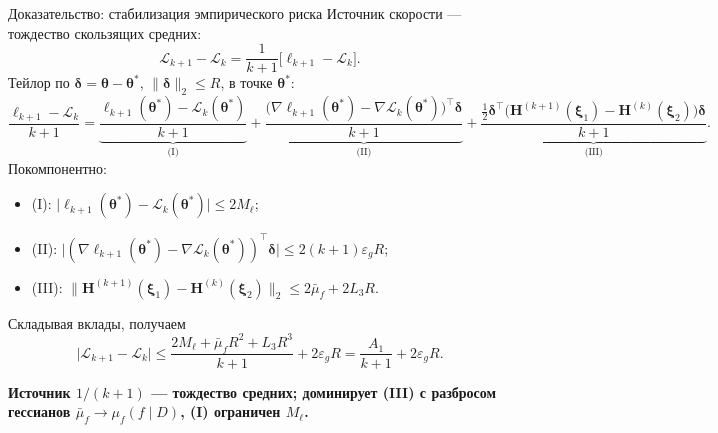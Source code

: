 \documentclass[9pt,pdf,hyperref={unicode}]{beamer}
\newcommand{\key}[1]{\par\vspace{0.5ex}\noindent\textbf{\color{darkgreen}#1}}
\begin{document}
\begin{frame}{Доказательство: стабилизация эмпирического риска}
\justifying
\footnotesize
\vspace{-2pt}
Источник скорости --- тождество скользящих средних:
\[
    \mathcal{L}_{k+1}-\mathcal{L}_k=\frac{1}{k+1}\bigl[\ell_{k+1}-\mathcal{L}_k\bigr].
\]
Тейлор по $\boldsymbol{\delta}=\boldsymbol{\theta}-\boldsymbol{\theta}^*$, $\|\boldsymbol{\delta}\|_2\le R$, в точке $\boldsymbol{\theta}^*$:
\[
    \frac{\ell_{k+1}-\mathcal{L}_k}{k+1}
    =\underbrace{\frac{\ell_{k+1}(\boldsymbol{\theta}^*)-\mathcal{L}_k(\boldsymbol{\theta}^*)}{k+1}}_{\text{(I)}}
    +\underbrace{\frac{\bigl(\nabla\ell_{k+1}(\boldsymbol{\theta}^*)-\nabla\mathcal{L}_k(\boldsymbol{\theta}^*)\bigr)^{\top}\boldsymbol{\delta}}{k+1}}_{\text{(II)}}
    +\underbrace{\frac{\tfrac12\boldsymbol{\delta}^{\top}\bigl(\mathbf{H}^{(k+1)}(\boldsymbol{\xi}_1)-\mathbf{H}^{(k)}(\boldsymbol{\xi}_2)\bigr)\boldsymbol{\delta}}{k+1}}_{\text{(III)}}.
\]
Покомпонентно:
\begin{itemize}
    \item (I): $\bigl|\ell_{k+1}(\boldsymbol{\theta}^*)-\mathcal{L}_k(\boldsymbol{\theta}^*)\bigr|\le 2M_\ell$;
    \item (II): $\bigl|(\nabla\ell_{k+1}(\boldsymbol{\theta}^*)-\nabla\mathcal{L}_k(\boldsymbol{\theta}^*))^{\top}\boldsymbol{\delta}\bigr|\le 2(k+1)\varepsilon_g R$;
    \item (III): $\bigl\|\mathbf{H}^{(k+1)}(\boldsymbol{\xi}_1)-\mathbf{H}^{(k)}(\boldsymbol{\xi}_2)\bigr\|_2\le 2\bar\mu_f+2L_3R$.
\end{itemize}
Складывая вклады, получаем
\[
    \bigl|\mathcal{L}_{k+1}-\mathcal{L}_k\bigr|\le\frac{2M_\ell+\bar\mu_fR^2+L_3R^3}{k+1}+2\varepsilon_gR=\frac{A_1}{k+1}+2\varepsilon_gR .
\]
\key{Источник $1/(k+1)$ --- тождество средних; доминирует (III) с разбросом гессианов $\bar\mu_f\to\mu_f(f\mid D)$, (I) ограничен $M_\ell$.}
\end{frame}
\end{document}
